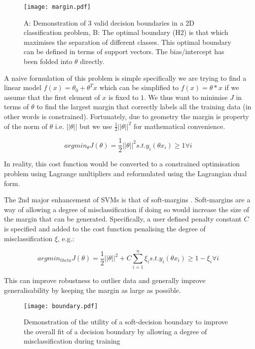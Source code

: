 \begin{figure}[h]
    \texttt{[image: margin.pdf]}
    \caption[SVM Decision Boundaries]{A: Demonstration of 3 valid decision boundaries in a 2D classification problem, B: The optimal boundary (H2) is that which maximises
        the separation of different classes.  This optimal boundary can be defined in terms of support vectors.  The bias/intercept has been 
    folded into \(\theta\) directly.}
    \label{fig:margin}
\end{figure}

A naive formulation of this problem is simple specifically we are trying to find a linear model \(f(x) = \theta_{0} + \theta^{T}x\) which can be simplified 
to \(f(x) = \theta * x \) if we assume that the first element of \(x\) is fixed to \(1\). We thus want to minimise \(J\) in terms of \(\theta\) to find
the largest margin that correctly labels all the training data (in other words is constrained).  Fortunately, due to geometry the margin is property of
the norm of \(\theta\) i.e. \(||\theta||\) but we use \(\frac{1}{2} ||\theta||^{2}\) for mathematical convenience.

\[argmin_{\theta} J(\theta) = \frac{1}{2} ||\theta||^{2} s.t. y_{i}(\theta x_{i}) \geq 1 \forall i\]

In reality, this cost function would be converted to a constrained optimisation problem using Lagrange multipliers and reformulated using the Lagrangian dual form. 


The 2nd major enhancement of SVMs is that of soft-margins \citep{Cortes1995}. Soft-margins are a way of allowing a degree of misclassification
if doing so would increase the size of the margin that can be generated.  Specifically, a user defined penalty constant \(C\) is specified and 
added to the cost function penalising the degree of misclassification \(\xi\), e.g.:

\[argmin_{theta} J(\theta) = \frac{1}{2} ||\theta||^{2}  + C \sum^{n}_{i=1} \xi_{i} s.t. y_{i}(\theta x_{i}) \geq 1 - \xi_{i} \forall i\] %

This can improve robustness to outlier data and generally improve generalisability by keeping the margin as large as possible.

\begin{figure}[h]
    \texttt{[image: boundary.pdf]}
    \caption[Soft-Margin Classifiers]{Demonstration of the utility of a soft-decision boundary to improve the overall
    fit of a decision boundary by allowing a degree of misclassification during training}
    \label{fig:boundary}
\end{figure}


